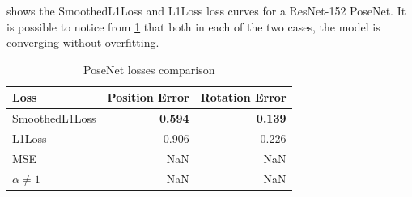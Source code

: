  shows the SmoothedL1Loss and L1Loss loss curves for a ResNet-152 PoseNet. It is possible to notice from \cref{tab:posenet-losses} that both in each of the two cases, the model is converging without overfitting.

\begin{table}[htbp]
    \caption{PoseNet losses comparison}
    \begin{center}
        \begin{tabular}{lrr}
            \toprule
            Loss            & {Position Error} & {Rotation Error} \\
            \midrule
            SmoothedL1Loss  & \textbf{0.594}   & \textbf{0.139}   \\
            L1Loss          & 0.906            & 0.226            \\
            MSE             & NaN              & NaN              \\
            $\alpha \neq 1$ & NaN              & NaN              \\
            \bottomrule
        \end{tabular}
        \label{tab:posenet-losses}
    \end{center}
\end{table}

